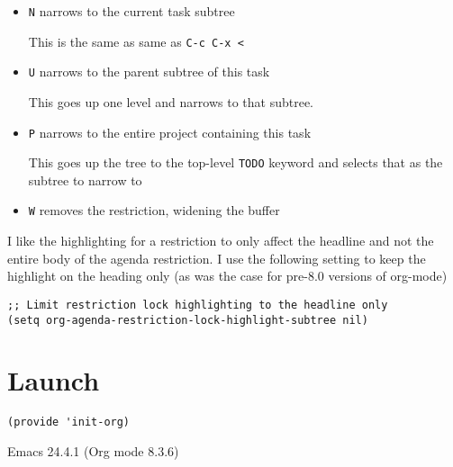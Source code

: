 \documentclass[11pt]{scrartcl}
\begin{document}
\begin{itemize}
\item \texttt{N} narrows to the current task subtree

This is the same as same as \texttt{C-c C-x <}

\item \texttt{U} narrows to the parent subtree of this task

This goes up one level and narrows to that subtree.

\item \texttt{P} narrows to the entire project containing this task

This goes up the tree to the top-level \texttt{TODO} keyword and selects
that as the subtree to narrow to

\item \texttt{W} removes the restriction, widening the buffer
\end{itemize}

I like the highlighting for a restriction to only affect the headline
and not the entire body of the agenda restriction.  I use the
following setting to keep the highlight on the heading only (as was
the case for pre-8.0 versions of org-mode)

\begin{verbatim}
;; Limit restriction lock highlighting to the headline only
(setq org-agenda-restriction-lock-highlight-subtree nil)
\end{verbatim}

\section{Launch}
\label{sec:orgheadline58}
\begin{verbatim}
(provide 'init-org)
\end{verbatim}
Emacs 24.4.1 (Org mode 8.3.6)
\end{document}
